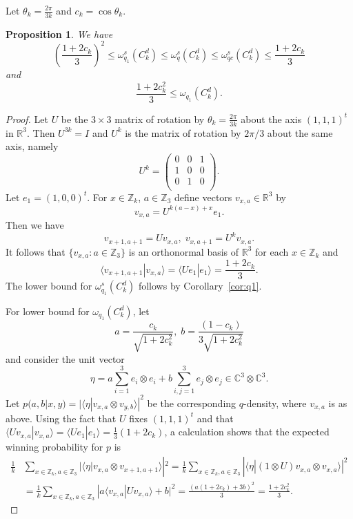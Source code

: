 \documentclass[11pt]{amsart}
\newtheorem{prop}[thm]{Proposition}
\theoremstyle{definition}
\newcommand{\bb}[1]{\mathbb{#1}}
\begin{document}
Let $\theta_k=\frac{2\pi}{3k}$ and $c_k=\cos\theta_k$.
\begin{prop}
  We have
  \[ \left(\frac{1+2c_k}3\right)^2 \le \omega_{q_1}^s(C_k^d)\le \omega_q^s(C_k^d)\le \omega_{qc}^s(C_k^d)\le \frac{1+2c_k}3\]
  and
  \[ \frac{1+2c_k^2}3\le \omega_{q_1}(C_k^d).\]
\end{prop}
\begin{proof}
  Let $U$ be the $3\times 3$ matrix of rotation by $\theta_k=\frac{2\pi}{3k}$ about the axis $(1,1,1)^t$ in $\bb R^3$. Then $U^{3k}=I$ and $U^k$ is the matrix of rotation by $2\pi/3$ about the same axis, namely \[U^k=\begin{pmatrix}
       0 & 0 & 1 \\
       1 & 0 & 0 \\
       0 & 1 & 0 \\
     \end{pmatrix}.\]
  Let $e_1=(1,0,0)^t$. For $x\in \bb Z_k$, $a\in \bb Z_3$ define vectors $v_{x,a}\in \bb R^3$ by
  \[v_{x,a}=U^{k(a-x)+x}e_1.\]
  Then we have \[ v_{x+1,a+1}=Uv_{x,a},\;v_{x,a+1}=U^kv_{x,a}.\]
  It follows that
  $\{v_{x,a}:a\in \bb Z_3\}$ is an orthonormal basis of $\bb R^3$ for each $x\in \bb Z_k$ and
  \[ \langle v_{x+1,a+1}|v_{x,a}\rangle=\langle Ue_1|e_1\rangle=\frac{1+2c_k}3.\]
  The lower bound for $\omega_{q_1}^s(C_k^d)$ follows by Corollary~\ref{cor:q1}.

  For lower bound for $\omega_{q_1}(C_k^d)$, let \[a=\frac{c_k}{\sqrt{1+2c_k^2}},\;b=\frac{(1-c_k)}{3\sqrt{1+2c_k^2}}\] and consider the unit vector
  \[ \eta=a\sum_{i=1}^3 e_i\otimes e_i+b\sum_{i,j=1}^3 e_j\otimes e_j\in \bb C^3\otimes \bb C^3.\]
  Let $p(a,b|x,y)=|\langle \eta|v_{x,a}\otimes v_{y,b}\rangle|^2$ be the corresponding $q$-density, where $v_{x,a}$ is as above. Using the fact that $U$ fixes $(1,1,1)^t$ and that $\langle Uv_{x,a}|v_{x,a}\rangle=\langle Ue_1|e_1\rangle=\frac13(1+2c_k)$, a calculation shows that the expected winning probability for $p$ is
  \begin{align*}
    \frac1k&\sum_{x\in \bb Z_k,a\in \bb Z_3}|\langle \eta|v_{x,a}\otimes v_{x+1,a+1}\rangle|^2=\frac1k\sum_{x\in \bb Z_k,a\in \bb Z_3}|\langle \eta|(1\otimes U)v_{x,a}\otimes v_{x,a}\rangle|^2\\&=\frac1k\sum_{x\in \bb Z_k,a\in \bb Z_3}|a\langle v_{x,a}|Uv_{x,a}\rangle+b|^2=\frac{(a(1+2c_k)+3b)^2}3=\frac{1+2c_k^2}3.
  \end{align*}


\end{proof}
\end{document}
